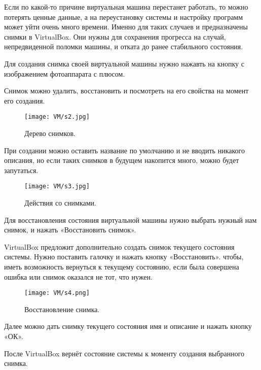 Если по какой-то причине виртуальная машина перестанет работать, то можно потерять ценные данные, а на переустановку системы и настройку программ может уйти очень много времени. Именно для таких случаев и предназначены снимки в VirtualBox. Они нужны для сохранения прогресса на случай, непредвиденной поломки машины, и отката до ранее стабильного состояния.

Для создания снимка своей виртуальной машины нужно нажавть на кнопку с изображением фотоаппарата с плюсом.

Снимок можно удалить, восстановить и посмотреть на его свойства на момент его создания.

\begin{figure}[h]
		\centering
		\texttt{[image: VM/s2.jpg]}
\caption{Дерево снимков.}
\label{ris:image}
\end{figure}

При создании можно оставить название по умолчанию и не вводить никакого описания, но если таких снимков в будущем накопится много, можно будет запутаться. 

\begin{figure}[h]
		\centering
		\texttt{[image: VM/s3.jpg]}
\caption{Действия со снимками.}
\label{ris:image}
\end{figure}

Для восстановления состояния виртуальной машины нужно выбрать нужный нам снимок, и нажать «Восстановить снимок».
 
VirtualBox предложит дополнительно создать снимок текущего состояния системы. Нужно поставить галочку и нажать кнопку «Восстановить». чтобы, иметь возможность вернуться к  текущему состоянию, если была совершена ошибка или снимок оказался не тот, что нужен.
 
\begin{figure}[h]
		\centering
		\texttt{[image: VM/s4.png]}
\caption{Восстановление снимка.}
\label{ris:image}
\end{figure}

Далее можно дать снимку текущего состояния имя и описание и нажать кнопку «ОК».

После VirtualBox вернёт состояние системы к моменту создания выбранного снимка.

